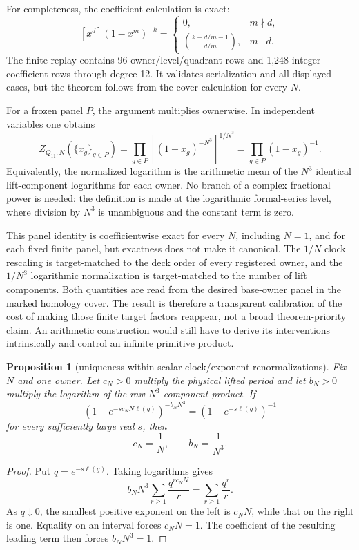 \documentclass[11pt]{article}
\newtheorem{proposition}[theorem]{Proposition}
\theoremstyle{definition}
\theoremstyle{remark}
\begin{document}
For completeness, the coefficient calculation is exact:
\[
[x^d](1-x^m)^{-k}=
\begin{cases}
0,&m\nmid d,\\
\binom{k+d/m-1}{d/m},&m\mid d.
\end{cases}
\]
The finite replay contains 96 owner/level/quadrant rows and 1,248 integer coefficient rows through degree 12. It validates serialization and all displayed cases, but the theorem follows from the cover calculation for every $N$.

For a frozen panel $P$, the argument multiplies ownerwise. In independent variables one obtains
\[
Z_{Q_{11},N}(\{x_g\}_{g\in P})
=\prod_{g\in P}\left[(1-x_g)^{-N^3}\right]^{1/N^3}
=\prod_{g\in P}(1-x_g)^{-1}.
\]
Equivalently, the normalized logarithm is the arithmetic mean of the $N^3$ identical lift-component logarithms for each owner. No branch of a complex fractional power is needed: the definition is made at the logarithmic formal-series level, where division by $N^3$ is unambiguous and the constant term is zero.

This panel identity is coefficientwise exact for every $N$, including $N=1$, and for each fixed finite panel, but exactness does not make it canonical. The $1/N$ clock rescaling is target-matched to the deck order of every registered owner, and the $1/N^3$ logarithmic normalization is target-matched to the number of lift components. Both quantities are read from the desired base-owner panel in the marked homology cover. The result is therefore a transparent calibration of the cost of making those finite target factors reappear, not a broad theorem-priority claim. An arithmetic construction would still have to derive its interventions intrinsically and control an infinite primitive product.

\begin{proposition}[uniqueness within scalar clock/exponent renormalizations]\label{prop:unique-renorm}
Fix $N$ and one owner. Let $c_N>0$ multiply the physical lifted period and let $b_N>0$ multiply the logarithm of the raw $N^3$-component product. If
\[
\left(1-e^{-s c_NN\ell(g)}\right)^{-b_NN^3}
=\left(1-e^{-s\ell(g)}\right)^{-1}
\]
for every sufficiently large real $s$, then
\[
c_N=\frac1N,
\qquad
b_N=\frac1{N^3}.
\]
\end{proposition}

\begin{proof}
Put $q=e^{-s\ell(g)}$. Taking logarithms gives
\[
b_NN^3\sum_{r\geq1}\frac{q^{r c_NN}}r
=\sum_{r\geq1}\frac{q^r}r.
\]
As $q\downarrow0$, the smallest positive exponent on the left is $c_NN$, while that on the right is one. Equality on an interval forces $c_NN=1$. The coefficient of the resulting leading term then forces $b_NN^3=1$.
\end{proof}
\end{document}
